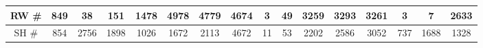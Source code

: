 \begin{table}[H]
\begin{tabular}{|c|c|c|c|c|c|c|c|c|c|c|c|c|c|c|c|}
		RW \# & \cellcolor[HTML]{ECF4FF}849                                              & \cellcolor[HTML]{ECF4FF}38                                               & \cellcolor[HTML]{ECF4FF}151                                              & \cellcolor[HTML]{ECF4FF}1478                                            & \cellcolor[HTML]{ECF4FF}4978                                           & \cellcolor[HTML]{ECF4FF}4779                                           & \cellcolor[HTML]{ECF4FF}4674                                           & \cellcolor[HTML]{ECF4FF}3                                                & \cellcolor[HTML]{ECF4FF}49                                               & \cellcolor[HTML]{ECF4FF}3259                                             & \cellcolor[HTML]{ECF4FF}3293                                             & \cellcolor[HTML]{ECF4FF}3261                                             & \cellcolor[HTML]{ECF4FF}3                                                & \cellcolor[HTML]{ECF4FF}7                                                & \cellcolor[HTML]{ECF4FF}2633                                             \\ \hline
		SH \# & \cellcolor[HTML]{CBCEFB}854                                              & \cellcolor[HTML]{CBCEFB}2756                                             & \cellcolor[HTML]{CBCEFB}1898                                             & \cellcolor[HTML]{CBCEFB}1026                                            & \cellcolor[HTML]{CBCEFB}1672                                           & \cellcolor[HTML]{CBCEFB}2113                                           & \cellcolor[HTML]{CBCEFB}4672                                           & \cellcolor[HTML]{CBCEFB}11                                               & \cellcolor[HTML]{CBCEFB}53                                               & \cellcolor[HTML]{CBCEFB}2202                                             & \cellcolor[HTML]{CBCEFB}2586                                             & \cellcolor[HTML]{CBCEFB}3052                                             & \cellcolor[HTML]{CBCEFB}737                                              & \cellcolor[HTML]{CBCEFB}1688                                             & \cellcolor[HTML]{CBCEFB}1328                                             \\ \hline

\end{tabular}
\end{table}
